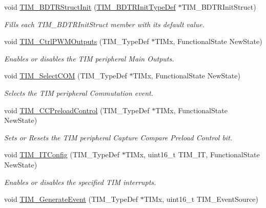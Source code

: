 \begin{DoxyCompactItemize}
void \hyperlink{group___t_i_m_gaea0f49938cda8ae0738162194798afc6}{T\-I\-M\-\_\-\-B\-D\-T\-R\-Struct\-Init} (\hyperlink{struct_t_i_m___b_d_t_r_init_type_def}{T\-I\-M\-\_\-\-B\-D\-T\-R\-Init\-Type\-Def} $\ast$T\-I\-M\-\_\-\-B\-D\-T\-R\-Init\-Struct)
\begin{DoxyCompactList}\small\item\em Fills each T\-I\-M\-\_\-\-B\-D\-T\-R\-Init\-Struct member with its default value. \end{DoxyCompactList}\item 
void \hyperlink{group___t_i_m_ga3e59ebced2ab8e0b817c460f1670e97d}{T\-I\-M\-\_\-\-Ctrl\-P\-W\-M\-Outputs} (T\-I\-M\-\_\-\-Type\-Def $\ast$T\-I\-Mx, Functional\-State New\-State)
\begin{DoxyCompactList}\small\item\em Enables or disables the T\-I\-M peripheral Main Outputs. \end{DoxyCompactList}\item 
void \hyperlink{group___t_i_m_gaff2e7f9959b1b36e830df028c14accc8}{T\-I\-M\-\_\-\-Select\-C\-O\-M} (T\-I\-M\-\_\-\-Type\-Def $\ast$T\-I\-Mx, Functional\-State New\-State)
\begin{DoxyCompactList}\small\item\em Selects the T\-I\-M peripheral Commutation event. \end{DoxyCompactList}\item 
void \hyperlink{group___t_i_m_ga0a935254e44312b1d78e8684a58db3c1}{T\-I\-M\-\_\-\-C\-C\-Preload\-Control} (T\-I\-M\-\_\-\-Type\-Def $\ast$T\-I\-Mx, Functional\-State New\-State)
\begin{DoxyCompactList}\small\item\em Sets or Resets the T\-I\-M peripheral Capture Compare Preload Control bit. \end{DoxyCompactList}\item 
void \hyperlink{group___t_i_m_ga70e3d6c09d55ee69002e154c85cd40e4}{T\-I\-M\-\_\-\-I\-T\-Config} (T\-I\-M\-\_\-\-Type\-Def $\ast$T\-I\-Mx, uint16\-\_\-t T\-I\-M\-\_\-\-I\-T, Functional\-State New\-State)
\begin{DoxyCompactList}\small\item\em Enables or disables the specified T\-I\-M interrupts. \end{DoxyCompactList}\item 
void \hyperlink{group___t_i_m_ga38bd4ffda920dd4f7655a0a2c6100a6e}{T\-I\-M\-\_\-\-Generate\-Event} (T\-I\-M\-\_\-\-Type\-Def $\ast$T\-I\-Mx, uint16\-\_\-t T\-I\-M\-\_\-\-Event\-Source)

\end{DoxyCompactItemize}
